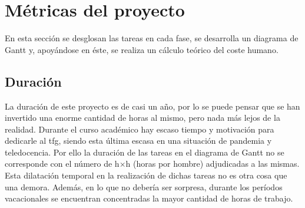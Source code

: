 \section{Métricas del proyecto}
En esta sección se desglosan las tareas en cada fase, se desarrolla un diagrama de Gantt y, apoyándose en éste, se realiza un cálculo teórico del coste humano.

\subsection{Duración}
La duración de este proyecto es de casi un año, por lo se puede pensar que se han invertido una enorme cantidad de horas al mismo, pero nada más lejos de la realidad. Durante el curso académico hay escaso tiempo y motivación para dedicarle al \acrshort{tfg}, siendo esta última escasa en una situación de pandemia y teledocencia. Por ello la duración de las tareas en el diagrama de Gantt no se corresponde con el número de h$\times$h (horas por hombre) adjudicadas a las mismas. Esta dilatación temporal en la realización de dichas tareas no es otra cosa que una demora. Además, en lo que no debería ser sorpresa, durante los períodos vacacionales se encuentran concentradas la mayor cantidad de horas de trabajo.

